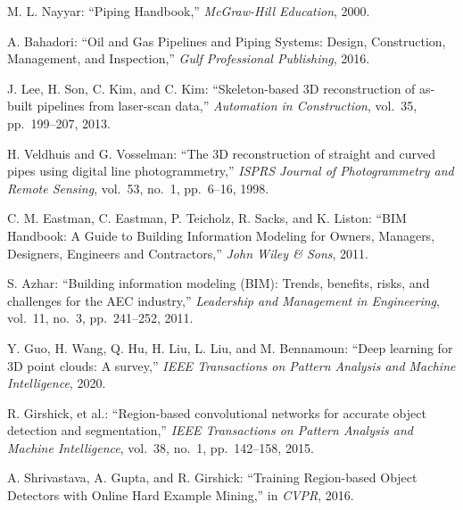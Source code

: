 

\begin{thebibliography}{9}				%

	M. L. Nayyar: 
			``Piping Handbook,'' 
			{\it McGraw-Hill Education}, 2000.

	A. Bahadori: 
			``Oil and Gas Pipelines and Piping Systems: Design, Construction, Management, and Inspection,'' 
			{\it Gulf Professional Publishing}, 2016.

	J. Lee, H. Son, C. Kim, and C. Kim: 
			``Skeleton-based 3D reconstruction of as-built pipelines from laser-scan data,'' 
			{\it Automation in Construction}, 
			vol.~35, pp.~199--207, 2013.

	H. Veldhuis and G. Vosselman: 
			``The 3D reconstruction of straight and curved pipes using digital line photogrammetry,'' 
			{\it ISPRS Journal of Photogrammetry and Remote Sensing}, 
			vol.~53, no.~1, pp.~6--16, 1998.

	C. M. Eastman, C. Eastman, P. Teicholz, R. Sacks, and K. Liston: 
			``BIM Handbook: A Guide to Building Information Modeling for Owners, Managers, Designers, Engineers and Contractors,'' 
			{\it John Wiley \& Sons}, 2011.

	S. Azhar: 
			``Building information modeling (BIM): Trends, benefits, risks, and challenges for the AEC industry,'' 
			{\it Leadership and Management in Engineering}, 
			vol.~11, no.~3, pp.~241--252, 2011.

	Y. Guo, H. Wang, Q. Hu, H. Liu, L. Liu, and M. Bennamoun: 
    ``Deep learning for 3D point clouds: A survey,'' 
    {\it IEEE Transactions on Pattern Analysis and Machine Intelligence}, 2020.
	
	R. Girshick, et al.: 
			``Region-based convolutional networks for accurate object detection and segmentation,'' 
			{\it IEEE Transactions on Pattern Analysis and Machine Intelligence}, 
			vol.~38, no.~1, pp.~142--158, 2015.

		A. Shrivastava, A. Gupta, and R. Girshick: 
				``Training Region-based Object Detectors with Online Hard Example Mining,'' 
				in {\it CVPR}, 2016.
			

\end{thebibliography}
